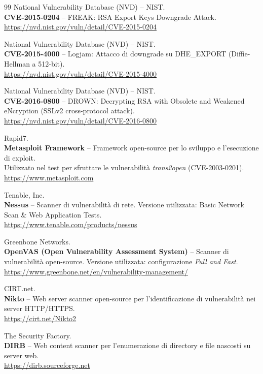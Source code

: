 \documentclass[12pt, a4paper]{article}
\begin{document}
\begin{thebibliography}{99}
	National Vulnerability Database (NVD) -- NIST.\\
	\textbf{CVE-2015-0204} -- FREAK: RSA Export Keys Downgrade Attack.\\
	\url{https://nvd.nist.gov/vuln/detail/CVE-2015-0204}

	National Vulnerability Database (NVD) -- NIST.\\
	\textbf{CVE-2015-4000} -- Logjam: Attacco di downgrade su DHE\_EXPORT (Diffie-Hellman a 512-bit).\\
	\url{https://nvd.nist.gov/vuln/detail/CVE-2015-4000}

	National Vulnerability Database (NVD) -- NIST.\\
	\textbf{CVE-2016-0800} -- DROWN: Decrypting RSA with Obsolete and Weakened eNcryption (SSLv2 cross-protocol attack).\\
	\url{https://nvd.nist.gov/vuln/detail/CVE-2016-0800}

	Rapid7.\\
	\textbf{Metasploit Framework} -- Framework open-source per lo sviluppo e l'esecuzione di exploit.\\
	Utilizzato nel test per sfruttare le vulnerabilità \textit{trans2open} (CVE-2003-0201).\\
	\url{https://www.metasploit.com}

	Tenable, Inc.\\
	\textbf{Nessus} -- Scanner di vulnerabilità di rete. Versione utilizzata: Basic Network Scan \& Web Application Tests.\\
	\url{https://www.tenable.com/products/nessus}

	Greenbone Networks.\\
	\textbf{OpenVAS (Open Vulnerability Assessment System)} -- Scanner di vulnerabilità open-source.
	Versione utilizzata: configurazione \textit{Full and Fast}.\\
	\url{https://www.greenbone.net/en/vulnerability-management/}

	CIRT.net.\\
	\textbf{Nikto} -- Web server scanner open-source per l'identificazione di vulnerabilità nei server HTTP/HTTPS.\\
	\url{https://cirt.net/Nikto2}

	The Security Factory.\\
	\textbf{DIRB} -- Web content scanner per l'enumerazione di directory e file nascosti su server web.\\
	\url{https://dirb.sourceforge.net}


\end{thebibliography}
\end{document}
